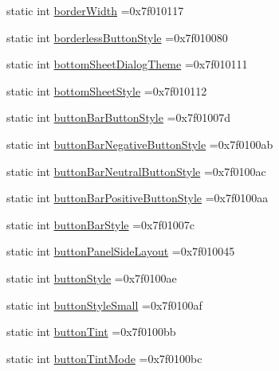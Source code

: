 \begin{DoxyCompactItemize}
static int \hyperlink{classandroid_1_1support_1_1design_1_1R_1_1attr_a1e35ba7b8eff870ac522092f0026cafc}{border\+Width} =0x7f010117
\item 
static int \hyperlink{classandroid_1_1support_1_1design_1_1R_1_1attr_ace596a46988f2ff961b6fb676b7ddf15}{borderless\+Button\+Style} =0x7f010080
\item 
static int \hyperlink{classandroid_1_1support_1_1design_1_1R_1_1attr_ac640b00f619be3b2138da92e008fbe7a}{bottom\+Sheet\+Dialog\+Theme} =0x7f010111
\item 
static int \hyperlink{classandroid_1_1support_1_1design_1_1R_1_1attr_a3d3267a3d987f32f59a02f0985be6a5c}{bottom\+Sheet\+Style} =0x7f010112
\item 
static int \hyperlink{classandroid_1_1support_1_1design_1_1R_1_1attr_a209ae9ca1ec9cf4b260524ededf1660c}{button\+Bar\+Button\+Style} =0x7f01007d
\item 
static int \hyperlink{classandroid_1_1support_1_1design_1_1R_1_1attr_abeb21f0b19ac0953b2c1e22f89ab62bc}{button\+Bar\+Negative\+Button\+Style} =0x7f0100ab
\item 
static int \hyperlink{classandroid_1_1support_1_1design_1_1R_1_1attr_a054db1c73ad10e31005b962d4ae8d094}{button\+Bar\+Neutral\+Button\+Style} =0x7f0100ac
\item 
static int \hyperlink{classandroid_1_1support_1_1design_1_1R_1_1attr_a2048c6806bc0c63b5b6d67b3e669df1c}{button\+Bar\+Positive\+Button\+Style} =0x7f0100aa
\item 
static int \hyperlink{classandroid_1_1support_1_1design_1_1R_1_1attr_aa4640454ea301f1d5b7b31f4b2486d9f}{button\+Bar\+Style} =0x7f01007c
\item 
static int \hyperlink{classandroid_1_1support_1_1design_1_1R_1_1attr_a0aa2e5b25e72f55f310faf2342f1cfaa}{button\+Panel\+Side\+Layout} =0x7f010045
\item 
static int \hyperlink{classandroid_1_1support_1_1design_1_1R_1_1attr_af1b31f0b5b93de1631dd3c9446564b39}{button\+Style} =0x7f0100ae
\item 
static int \hyperlink{classandroid_1_1support_1_1design_1_1R_1_1attr_a60fe75448db0912a195a7f3f56f3cbe3}{button\+Style\+Small} =0x7f0100af
\item 
static int \hyperlink{classandroid_1_1support_1_1design_1_1R_1_1attr_ad8dc41dd7bb0cb9f98da77fc78f0c9a2}{button\+Tint} =0x7f0100bb
\item 
static int \hyperlink{classandroid_1_1support_1_1design_1_1R_1_1attr_a8f45cc6e039e1e19c4c368e82b8e4939}{button\+Tint\+Mode} =0x7f0100bc
\item 

\end{DoxyCompactItemize}

